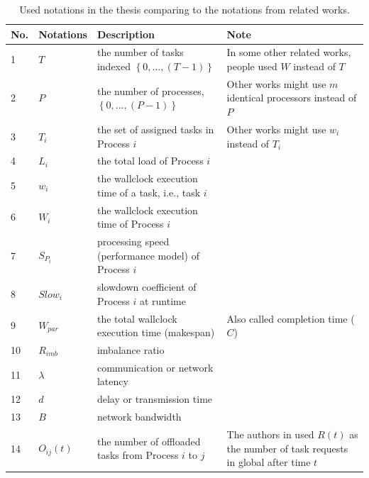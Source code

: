 \begin{table}[t]
\centering
\begin{tabular}{|l|p{2cm}|p{5cm}|p{4.5cm}|}
\hline
\textbf{No.} & \textbf{Notations} & \textbf{Description} & \textbf{Note}        \\ \hline
1  & $T$          & the number of tasks indexed $\left \{0,...,(T-1) \right \}$ & In some other related works, people used $W$ instead of $T$   \\ \hline
2  & $P$					& the number of processes, $\left \{0,...,(P-1) \right \}$    & Other works might use $m$ identical processors instead of $P$ \\ \hline
3  & $T_{i}$			& the set of assigned tasks in Process $i$                    & Other works might use $w_{i}$ instead of $T_{i}$              \\ \hline
4  & $L_{i}$			& the total load of Process $i$                               &                                             \\ \hline
5  & $w_{i}$			& the wallclock execution time of a task, i.e., task $i$      &                                             \\ \hline
6  & $W_{i}$ 			& the wallclock execution time of Process $i$                 &                                             \\ \hline
7  & $S_{P_{i}}$	& processing speed (performance model) of Process $i$         &                                             \\ \hline
8  & $Slow_{i}$		& slowdown coefficient of Process $i$ at runtime              &                                             \\ \hline
9  & $W_{par}$		& the total wallclock execution time (makespan)               & Also called completion time ($C$)           \\ \hline
10 & $R_{imb}$		& imbalance ratio                                             &                                             \\ \hline
11 & $\lambda$		& communication or network latency                            &                                             \\ \hline
12 & $d$					& delay or transmission time                                  &                                             \\ \hline
13 & $B$					& network bandwidth                                           &                                             \\ \hline
14 & $O_{ij}(t)$	& the number of offloaded tasks from Process $i$ to $j$       & The authors in \cite{tchiboukdjian2010tighter} used $R(t)$ as the number of task requests in global after time $t$ \\ \hline
\end{tabular}
\caption{Used notations in the thesis comparing to the notations from related works.}
\label{tab:mapped_notation_table}
\end{table}

